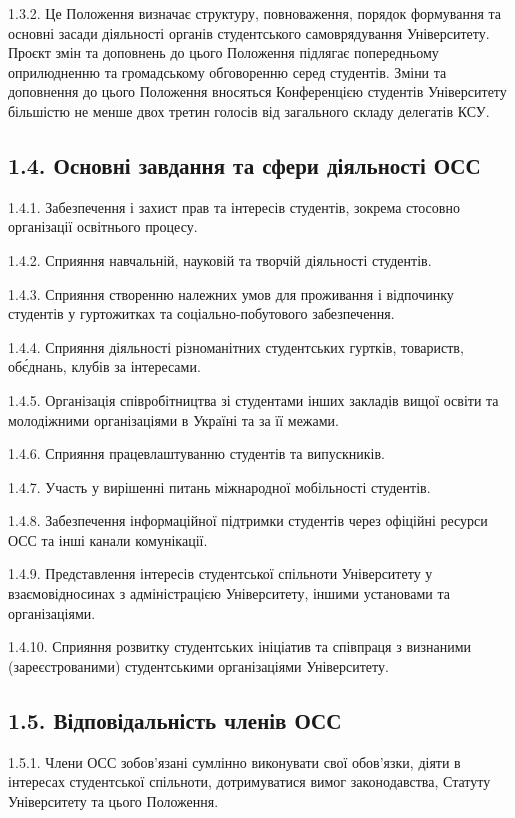     1.3.2. Це Положення визначає структуру, повноваження, порядок формування та основні засади діяльності органів студентського самоврядування Університету. Проєкт змін та доповнень до цього Положення підлягає попередньому оприлюдненню та громадському обговоренню серед студентів. Зміни та доповнення до цього Положення вносяться Конференцією студентів Університету більшістю не менше двох третин голосів від загального складу делегатів КСУ.

\subsection*{1.4. Основні завдання та сфери діяльності ОСС}
    1.4.1. Забезпечення і захист прав та інтересів студентів, зокрема стосовно організації освітнього процесу.

    1.4.2. Сприяння навчальній, науковій та творчій діяльності студентів.

    1.4.3. Сприяння створенню належних умов для проживання і відпочинку студентів у гуртожитках та соціально-побутового забезпечення.

    1.4.4. Сприяння діяльності різноманітних студентських гуртків, товариств, об\'єднань, клубів за інтересами.

    1.4.5. Організація співробітництва зі студентами інших закладів вищої освіти та молодіжними організаціями в Україні та за її межами.

    1.4.6. Сприяння працевлаштуванню студентів та випускників.

    1.4.7. Участь у вирішенні питань міжнародної мобільності студентів.

    1.4.8. Забезпечення інформаційної підтримки студентів через офіційні ресурси ОСС та інші канали комунікації.

    1.4.9. Представлення інтересів студентської спільноти Університету у взаємовідносинах з адміністрацією Університету, іншими установами та організаціями.

    1.4.10. Сприяння розвитку студентських ініціатив та співпраця з визнаними (зареєстрованими) студентськими організаціями Університету.

\subsection*{1.5. Відповідальність членів ОСС}
    1.5.1. Члени ОСС зобов'язані сумлінно виконувати свої обов'язки, діяти в інтересах студентської спільноти, дотримуватися вимог законодавства, Статуту Університету та цього Положення.

